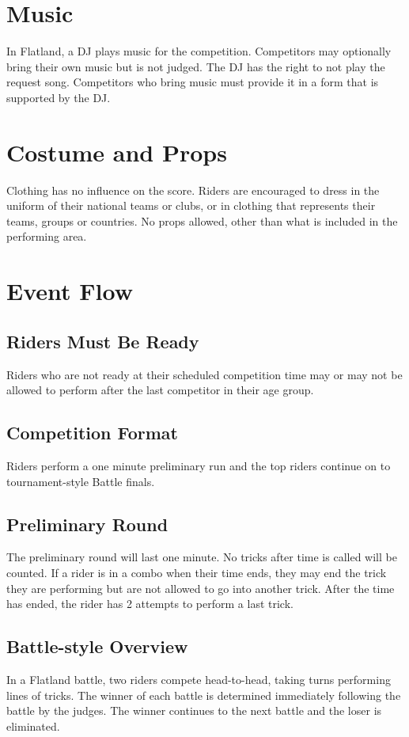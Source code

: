 \section{Music}

In Flatland, a DJ plays music for the competition.
Competitors may optionally bring their own music but is not judged.
The DJ has the right to not play the request song.
Competitors who bring music must provide it in a form that is supported by the DJ.

\section{Costume and Props}
Clothing has no influence on the score.
Riders are encouraged to dress in the uniform of their national teams or clubs, or in clothing that represents their teams, groups or countries.
No props allowed, other than what is included in the performing area.

\section{Event Flow}

\subsection{Riders Must Be Ready}

Riders who are not ready at their scheduled competition time may or may not be allowed to perform after the last competitor in their age group.

\subsection{Competition Format}
Riders perform a one minute preliminary run and the top riders continue on to tournament-style Battle finals.

\subsection{Preliminary Round}

The preliminary round will last one minute.
No tricks after time is called will be counted.
If a rider is in a combo when their time ends, they may end the trick they are performing but are not allowed to go into another trick.
After the time has ended, the rider has 2 attempts to perform a last trick.

\subsection{Battle-style Overview}
In a Flatland battle, two riders compete head-to-head, taking turns performing lines of tricks.
The winner of each battle is determined immediately following the battle by the judges.
The winner continues to the next battle and the loser is eliminated.

